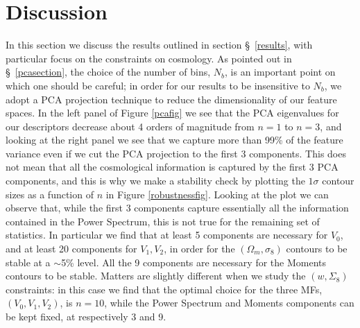 \documentclass[reprint,aps,prd,superscriptaddress,showkeys,showpacs]{revtex4-1}
\begin{document}

\section{Discussion}
\label{discussion}

In this section we discuss the results outlined in section \S~\ref{results}, with particular focus on the constraints on cosmology. As pointed out in \S~\ref{pcasection}, the choice of the number of bins, $N_b$, is an important point on which one should be careful; in order for our results to be insensitive to $N_b$, we adopt a PCA projection technique to reduce the dimensionality of our feature spaces. In the left panel of Figure \ref{pcafig} we see that the PCA eigenvalues for our descriptors decrease about 4 orders of magnitude from $n=1$ to $n=3$, and looking at the right panel we see that we capture more than 99\% of the feature variance even if we cut the PCA projection to the first 3 components. This does not mean that all the cosmological information is captured by the first 3 PCA components, and this is why we make a stability check by plotting the $1\sigma$ contour sizes as a function of $n$ in Figure \ref{robustnessfig}. Looking at the plot we can observe that, while the first 3 components capture essentially all the information contained in the Power Spectrum, this is not true for the remaining set of statistics. In particular we find that at least 5 components are necessary for $V_0$, and at least 20 components for $V_1,V_2$, in order for the $(\Omega_m,\sigma_8)$ contours to be stable at a $\sim$5\% level. All the 9 components are necessary for the Moments contours to be stable. Matters are slightly different when we study the $(w,\Sigma_8)$ constraints: in this case we find that the optimal choice for the three MFs, $(V_0,V_1,V_2)$, is $n=10$, while the Power Spectrum and Moments components can be kept fixed, at respectively 3 and 9. 
\end{document}
